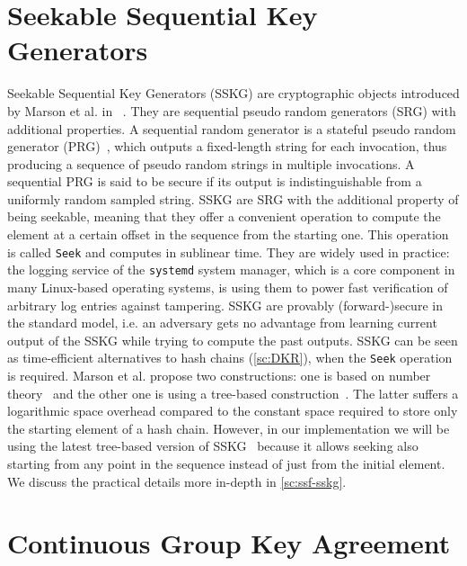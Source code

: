 \section{Seekable Sequential Key Generators}\label{sc:SSKG}

Seekable Sequential Key Generators (SSKG) are cryptographic objects introduced by Marson et al. in ~\cite{ESORICS:MarPoe13}.
They are sequential pseudo random generators (SRG) with additional properties.
A sequential random generator is a stateful pseudo random generator (PRG)~\cite{cryptoeprint:2017/208}, 
which outputs a fixed-length string for each invocation, 
thus producing a sequence of pseudo random strings in multiple invocations.
A sequential PRG is said to be secure if its output is indistinguishable from a uniformly random sampled string.
SSKG are SRG with the additional property of being seekable,
meaning that they offer a convenient operation to compute the
element at a certain offset in the sequence from the starting one.
This operation is called \texttt{Seek} and computes in sublinear time.
They are widely used in practice:
the logging service of the \texttt{systemd} system manager,
which is a core component in many Linux-based operating systems,
is using them to power fast verification of arbitrary log entries against tampering.
SSKG are provably (forward-)secure in the standard model, i.e.
an adversary gets no advantage from learning current output of the SSKG
while trying to compute the past outputs.
SSKG can be seen as time-efficient alternatives to hash chains (\cref{sc:DKR}),
when the \texttt{Seek} operation is required.
Marson et al. propose two constructions: one is based on number theory~\cite{ESORICS:MarPoe13}
and the other one is using a tree-based construction~\cite{ESORICS:MarPoe14}.
The latter suffers a logarithmic space overhead 
compared to the constant space required to store 
only the starting element of a hash chain.
However, in our implementation we will be using the latest tree-based version of SSKG~\cite{ESORICS:MarPoe14}
because it allows seeking also starting from any point in the sequence
instead of just from the initial element.
We discuss the practical details more in-depth in \cref{sc:ssf-sskg}.

\section{Continuous Group Key Agreement}\label{sc:CGKA}

